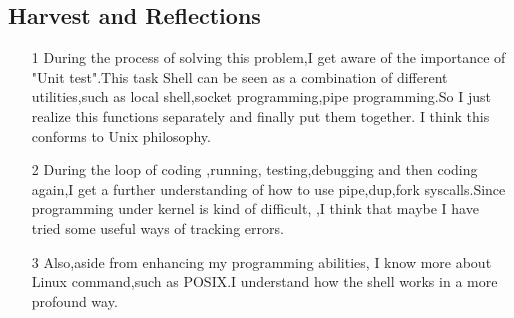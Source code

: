 \documentclass[]{article}
\begin{document}
\subsection*{Harvest and Reflections}
    \begin{enumerate}
        \item [1] During the process of solving this problem,I get aware of the importance of "Unit test".This task Shell can be seen as 
        a combination of different utilities,such as local shell,socket programming,pipe programming.So I just realize this functions separately and finally put them together.
        I think this conforms to Unix philosophy.
        \item[2] During the loop of coding ,running, testing,debugging and then coding again,I get a further understanding of how to use pipe,dup,fork syscalls.Since programming under kernel is kind of difficult,
        ,I think that maybe I have tried some useful ways of tracking errors.
        \item[3] Also,aside from enhancing my programming abilities, I know more about Linux command,such as POSIX.I understand how the shell works in a more profound way.
    \end{enumerate}
\end{document}
